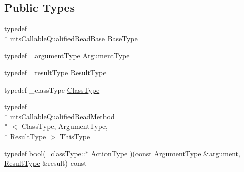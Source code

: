 \subsection*{Public Types}
\begin{DoxyCompactItemize}
\item 
typedef \\*
\hyperlink{classmts_callable_qualified_read_base}{mts\-Callable\-Qualified\-Read\-Base} \hyperlink{classmts_callable_qualified_read_method_a67c32118a2cca1e3ed70a730e6d53045}{Base\-Type}
\item 
typedef \-\_\-argument\-Type \hyperlink{classmts_callable_qualified_read_method_af34f9b3cadebbfecbd679e98c1db0e88}{Argument\-Type}
\item 
typedef \-\_\-result\-Type \hyperlink{classmts_callable_qualified_read_method_a728e57693d845188e5c248a6437f843e}{Result\-Type}
\item 
typedef \-\_\-class\-Type \hyperlink{classmts_callable_qualified_read_method_a6cfee5c3c3c49c691c2f5176ea79d735}{Class\-Type}
\item 
typedef \\*
\hyperlink{classmts_callable_qualified_read_method}{mts\-Callable\-Qualified\-Read\-Method}\\*
$<$ \hyperlink{classmts_callable_qualified_read_method_a6cfee5c3c3c49c691c2f5176ea79d735}{Class\-Type}, \hyperlink{classmts_callable_qualified_read_method_af34f9b3cadebbfecbd679e98c1db0e88}{Argument\-Type}, \\*
\hyperlink{classmts_callable_qualified_read_method_a728e57693d845188e5c248a6437f843e}{Result\-Type} $>$ \hyperlink{classmts_callable_qualified_read_method_a4eae6a460f791fe12b4dcf83d83d429e}{This\-Type}
\item 
typedef bool(\-\_\-class\-Type\-::$\ast$ \hyperlink{classmts_callable_qualified_read_method_ac6fc895837df0b66d84405f3ee01f153}{Action\-Type} )(const \hyperlink{classmts_callable_qualified_read_method_af34f9b3cadebbfecbd679e98c1db0e88}{Argument\-Type} \&argument, \hyperlink{classmts_callable_qualified_read_method_a728e57693d845188e5c248a6437f843e}{Result\-Type} \&result) const 
\end{DoxyCompactItemize}
